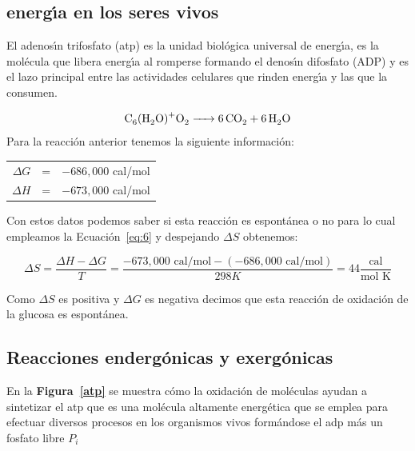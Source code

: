 \subsection{energ\'{\i}a en los seres vivos}

El adenos\'{\i}n trifosfato (\gls{atp})  es la unidad biol\'ogica universal de energ\'{\i}a, es la mol\'ecula que libera energ\'{\i}a  al romperse formando el denos\'{\i}n difosfato (ADP)  y es el lazo principal entre las actividades celulares que rinden energ\'{\i}a y las que la consumen.

\begin{equation}
\ce{C6(H2O)+ O2 ->  6CO2 + 6H2O }
\end{equation}
Para la reacci\'on anterior tenemos la siguiente informaci\'on:

\begin{tabular}{rcl}
$\Delta G$ & = & $-686,000 $ cal/mol \\
$\Delta H$ & = & $-673,000 $ cal/mol \\
\end{tabular}

Con estos datos podemos saber si esta reacci\'on es espont\'anea o no para lo cual empleamos
la Ecuaci\'on~\ref{eq:6} y despejando $\Delta S$ obtenemos:

$$\Delta S = \frac{\Delta H-\Delta G}{T} =\frac{-673,000 \textrm{ cal/mol}-( -686,000 \textrm{ cal/mol})}{298
K}= 44 \frac{\mathrm{cal}}{\textrm{mol K}}$$

Como $\Delta S$ es positiva y $\Delta G$ es negativa decimos que esta reacci\'on de
oxidaci\'on de la glucosa es espont\'anea.

\subsection{Reacciones enderg\'onicas y exerg\'onicas}
En la \textbf{Figura~\ref{atp}} se muestra c\'omo la oxidaci\'on de mol\'eculas ayudan a sintetizar el
\gls{atp} que es una mol\'ecula altamente energ\'etica que se emplea para efectuar
diversos procesos en los organismos vivos form\'andose el \gls{adp} m\'as un
fosfato libre $P_i$

